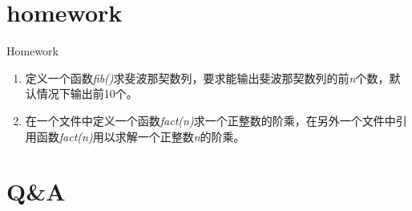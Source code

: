 \documentclass{beamer}
\begin{document}
\section{homework}
\begin{frame}{Homework}
\begin{enumerate}
\item
定义一个函数\textit{fib()}求斐波那契数列，要求能输出斐波那契数列的前\textit{n}个数，默认情况下输出前10个。
\item
在一个文件中定义一个函数\textit{fact(n)}求一个正整数的阶乘，在另外一个文件中引用函数\textit{fact(n)}用以求解一个正整数\textit{n}的阶乘。
\end{enumerate}
\end{frame}
\section{Q\&A}
\begin{frame}
\end{frame}


%
\end{document}
